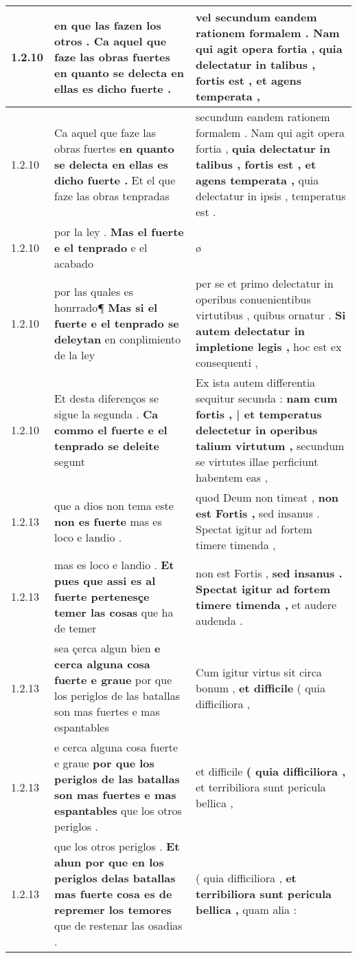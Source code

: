 \begin{tabular}{|p{1cm}|p{6.5cm}|p{6.5cm}|}
1.2.10 & en que las fazen los otros . \textbf{ Ca aquel que faze las obras fuertes } en quanto se delecta en ellas es dicho fuerte . & vel \textbf{ secundum eandem rationem formalem . Nam qui agit opera fortia , } quia delectatur in talibus , fortis est , et agens temperata , \\\hline
1.2.10 & Ca aquel que faze las obras fuertes \textbf{ en quanto se delecta en ellas es dicho fuerte . } Et el que faze las obras tenpradas & secundum eandem rationem formalem . Nam qui agit opera fortia , \textbf{ quia delectatur in talibus , fortis est , et agens temperata , } quia delectatur in ipsis , temperatus est . \\\hline
1.2.10 & por la ley . \textbf{ Mas el fuerte e el tenprado } e el acabado & ø \\\hline
1.2.10 & por las quales es honrrado¶ \textbf{ Mas si el fuerte e el tenprado se deleytan } en conplimiento de la ley & per se et primo delectatur in operibus conuenientibus virtutibus , quibus ornatur . \textbf{ Si autem delectatur in impletione legis , } hoc est ex consequenti , \\\hline
1.2.10 & Et desta diferenços se sigue la segunda . \textbf{ Ca commo el fuerte e el tenprado se deleite } segunt & Ex ista autem differentia sequitur secunda : \textbf{ nam cum fortis , | et temperatus delectetur in operibus talium virtutum , } secundum se virtutes illae perficiunt habentem eas , \\\hline
1.2.13 & que a dios non tema este \textbf{ non es fuerte } mas es loco e landio . & quod Deum non timeat , \textbf{ non est Fortis , } sed insanus . Spectat igitur ad fortem timere timenda , \\\hline
1.2.13 & mas es loco e landio . \textbf{ Et pues que assi es al fuerte pertenesçe temer las cosas } que ha de temer & non est Fortis , \textbf{ sed insanus . Spectat igitur ad fortem timere timenda , } et audere audenda . \\\hline
1.2.13 & sea çerca algun bien \textbf{ e cerca alguna cosa fuerte e graue } por que los periglos de las batallas son mas fuertes e mas espantables & Cum igitur virtus sit circa bonum , \textbf{ et difficile } ( quia difficiliora , \\\hline
1.2.13 & e cerca alguna cosa fuerte e graue \textbf{ por que los periglos de las batallas son mas fuertes e mas espantables } que los otros periglos . & et difficile \textbf{ ( quia difficiliora , } et terribiliora sunt pericula bellica , \\\hline
1.2.13 & que los otros periglos . \textbf{ Et ahun por que en los periglos delas batallas mas fuerte cosa es de repremer los temores } que de restenar las osadias . & ( quia difficiliora , \textbf{ et terribiliora sunt pericula bellica , } quam alia : \\\hline

\end{tabular}

